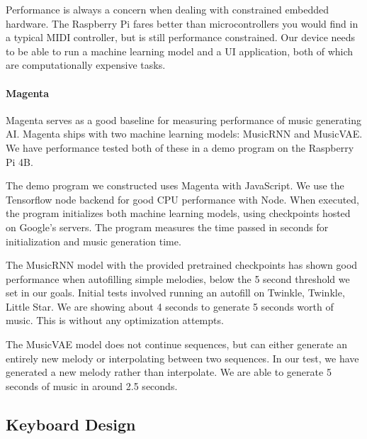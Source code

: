Performance is always a concern when dealing with constrained embedded hardware. The
Raspberry Pi fares better than microcontrollers you would find in a typical MIDI
controller, but is still performance constrained. Our device needs to be able to run a
machine learning model and a UI application, both of which are computationally expensive
tasks.

\paragraph{Magenta}

Magenta serves as a good baseline for measuring performance of music generating AI.
Magenta ships with two machine learning models: MusicRNN and MusicVAE. We have performance
tested both of these in a demo program on the Raspberry Pi 4B.

The demo program we constructed uses Magenta with JavaScript. We use the Tensorflow node
backend for good CPU performance with Node. When executed, the program initializes both
machine learning models, using checkpoints hosted on Google's servers. The program
measures the time passed in seconds for initialization and music generation time.

The MusicRNN model with the provided pretrained checkpoints has shown good performance
when autofilling simple melodies, below the 5 second threshold we set in our goals.
Initial tests involved running an autofill on Twinkle, Twinkle, Little Star. We are
showing about 4 seconds to generate 5 seconds worth of music. This is without any
optimization attempts.

The MusicVAE model does not continue sequences, but can either generate an entirely new
melody or interpolating between two sequences. In our test, we have generated a new melody
rather than interpolate. We are able to generate 5 seconds of music in around 2.5 seconds.

\subsection{Keyboard Design}
